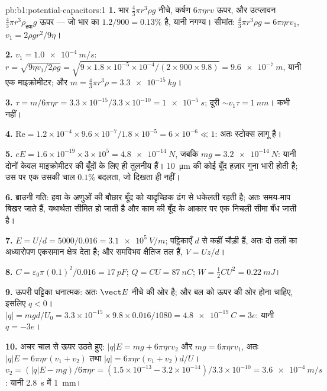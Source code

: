 \begin{solution}{pb:b1:potential-capacitors:1}
\textbf{1.} भार $\tfrac43\pi r^3\rho g$ नीचे, कर्षण $6\pi\eta rv$ ऊपर, और
उत्प्लावन $\tfrac43\pi r^3\rho_{\text{हवा}}g$ ऊपर --- जो भार का
$1.2/900 = 0.13\%$ है, यानी नगण्य। सीमांत: $\tfrac43\pi r^3\rho g = 6\pi\eta rv_1$, $v_1 =
2\rho gr^2/9\eta$।

\textbf{2.} $v_1 = \qty{1.0e-4}{m/s}$: $r = \sqrt{9\eta v_1/2\rho g} = \sqrt{9 \times
1.8 \times 10^{-5} \times 10^{-4}/(2 \times 900 \times 9.8)} = \qty{9.6e-7}{m}$, यानी
एक माइक्रोमीटर; और $m = \tfrac43\pi r^3\rho = \qty{3.3e-15}{kg}$।

\textbf{3.} $\tau = m/6\pi\eta r = 3.3 \times 10^{-15}/3.3 \times 10^{-10} = \qty{1e-5}{s}$;
दूरी $\sim v_1\tau = \qty{1}{nm}$। कभी नहीं।

\textbf{4.} $\mathrm{Re} = 1.2 \times 10^{-4} \times 9.6 \times 10^{-7}/1.8 \times 10^{-5} =
6 \times 10^{-6} \ll 1$: अतः स्टोक्स लागू है।

\textbf{5.} $eE = 1.6 \times 10^{-19} \times 3 \times 10^5 = \qty{4.8e-14}{N}$, जबकि
$mg = \qty{3.2e-14}{N}$: यानी दोनों केवल माइक्रोमीटर की बूँदों के लिए ही
तुलनीय हैं। \qty{10}{\micro m} की कोई बूँद हज़ार गुना भारी होती है; उस पर एक
 उसकी चाल $0.1\%$ बदलता, जो दिखता ही नहीं।

\textbf{6.} ब्राउनी गति: हवा के अणुओं की बौछार बूँद को यादृच्छिक ढंग से
धकेलती रहती है; अतः समय-माप बिखर जाते हैं, यथार्थता सीमित हो जाती है और
काम की बूँद के आकार पर एक निचली सीमा बँध जाती है।

\textbf{7.} $E = U/d = 5000/0.016 = \qty{3.1e5}{V/m}$; पट्टिकाएँ
$d$ से कहीं चौड़ी हैं, अतः दो तलों का अध्यारोपण एकसमान क्षेत्र देता है; और
समविभव क्षैतिज तल हैं, $V = Uz/d$।

\textbf{8.} $C = \varepsilon_0\pi(0.1)^2/0.016 = \qty{17}{pF}$; $Q = CU = \qty{87}{nC}$;
$W = \tfrac12CU^2 = \qty{0.22}{mJ}$।

\textbf{9.} ऊपरी पट्टिका धनात्मक: अतः $\vect E$ नीचे की ओर है; और बल को ऊपर
की ओर होना चाहिए, इसलिए $q < 0$। $|q| = mgd/U_0 = 3.3 \times 10^{-15} \times 9.8 \times 0.016/
1080 = \qty{4.8e-19}{C} = 3e$: यानी $q = -3e$।

\textbf{10.} अचर चाल से ऊपर उठते हुए: $|q|E = mg + 6\pi\eta rv_2$ और $mg =
6\pi\eta rv_1$, अतः $|q|E = 6\pi\eta r(v_1 + v_2)$ तथा $|q| = 6\pi\eta r(v_1 +
v_2)d/U$। $v_2 = (|q|E - mg)/6\pi\eta r = (1.5 \times 10^{-13} - 3.2 \times 10^{-14})/
3.3 \times 10^{-10} = \qty{3.6e-4}{m/s}$: यानी \qty{2.8}{s} में \qty{1}{mm}।


\end{solution}
